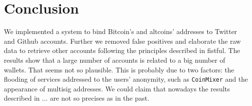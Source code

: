 \section{Conclusion} \label{conclusion}
We implemented a system to bind Bitcoin's and altcoins' addresses to Twitter
and Github accounts. Further we removed false positives and elaborate the raw
data to retrieve other accounts following the principles described in fistful.
The results show that a large number of accounts is related to a big number of
wallets. That seems not so plausible. This is probably due to two factors: the
flooding of services addressed to the users' anonymity, such as
\texttt{CoinMixer} and the appearance of multisig addresses. We could claim
that nowadays the results described in ... are not so precises as in the past.